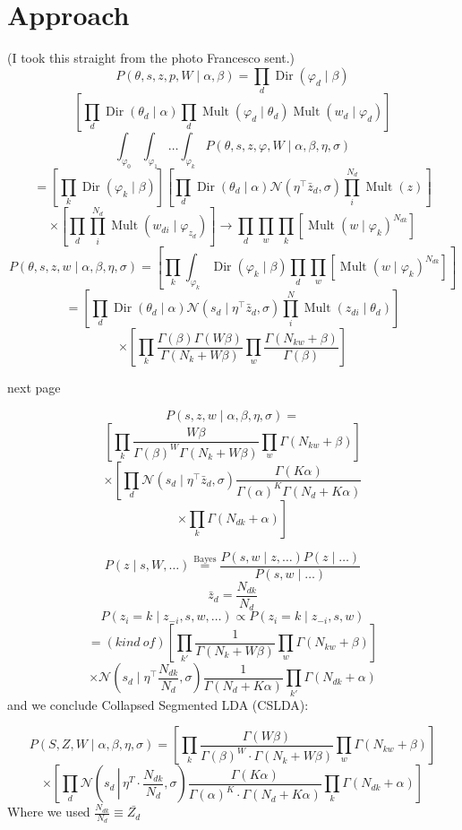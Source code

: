 \documentclass[a4paper,10pt]{article}
\DeclareMathOperator{\Dir}{Dir}
\DeclareMathOperator{\Mult}{Mult}
\renewcommand{\phi}{\varphi}
\begin{document}
\section{Approach}
(I took this straight from the photo Francesco sent.)
\begin{equation}
  P(\theta, s, z, p,  W\mid \alpha, \beta) = \prod_{d} \Dir(\varphi_d \mid \beta)
\end{equation}
\[\left[ \prod_{d} \Dir(\theta_d \mid \alpha) \prod_d \Mult(\phi_d \mid \theta_d )\Mult(w_d \mid \phi_d)\right]\]
\[\int_{\phi_0}\int_{\phi_1}\dots \int_{\phi_k} P(\theta, s, z, \phi, W \mid \alpha, \beta, \eta, \sigma)\]
\[=\left[ \prod_k \Dir(\phi_k \mid \beta) \right] \left[ \prod_d \Dir(\theta_d \mid \alpha) \mathcal{N}(\eta^\top \bar{z}_d, \sigma) \prod_i^{N_d} \Mult(z) \right]\]
\[\times \left[  \prod_d \prod_i^{N_d} \Mult(w_{di} \mid \phi_{z_d})\right] \rightarrow \prod_d \prod_w \prod_k \left[ \Mult(w \mid \phi_k)^{N_{dk}}\right]\]
\[P(\theta, s, z, w \mid \alpha, \beta, \eta, \sigma) = \left[ \prod_k \int_{\phi_k} \Dir(\phi_k \mid \beta) \prod_d \prod_w \left[ \Mult(w \mid \phi_k)^{N_{dk}}\right] \right]\]
\[ = \left[ \prod_d \Dir(\theta_d \mid \alpha) \mathcal{N}(s_d \mid \eta^\top \bar{z}_d, \sigma) \prod_i^N \Mult(z_{di} \mid \theta_d) \right]\]
\[\times \left[ \prod_k \frac{\Gamma(\beta) \Gamma(W\beta)}{\Gamma(N_k + W\beta)} \prod_w \frac{\Gamma(N_{kw}+\beta)}{\Gamma(\beta)}\right]\]

{next page}

\[P(s, z, w \mid\alpha, \beta, \eta, \sigma) = \]
\[\left[ \prod_k \frac{W\beta}{\Gamma(\beta)^W \Gamma(N_k + W\beta)} \prod_w \Gamma(N_{kw} + \beta)\right]\]
\[\times \left[\prod_d \mathcal{N}(s_d \mid \eta^\top \bar{z}_d, \sigma) \frac{\Gamma(K\alpha)}{\Gamma(\alpha)^K\Gamma(N_d + K \alpha)}\right.\]
\[\left.\times \prod_k \Gamma(N_{dk} + \alpha)\right]\]

\[P(z\mid s, W, \dots) \overset{\text{Bayes}}{=} \frac{P(s,w \mid z, \dots) P(z\mid \dots)}{P(s,w \mid \dots)}\]
\[\bar{z}_{d} = \frac{N_{dk}}{N_d}\]
\[P(z_i = k \mid z_{-i}, s, w, \dots) \propto P(z_i =k\mid z_{-i}, s, w)\]
\[=(kind~of) \left[ \prod_{k'} \frac{1}{\Gamma(N_k + W\beta)} \prod_w \Gamma(N_{kw} + \beta)\right]\]
\[\times \mathcal{N}\left(s_d \mid \eta^\top \frac{N_{dk}}{N_d}, \sigma\right)\frac{1}{\Gamma(N_d + K\alpha)} \prod_{k'}\Gamma(N_{dk} + \alpha)\]
and we conclude
Collapsed Segmented LDA (CSLDA):

$$ P(S, Z, W \mid \alpha, \beta, \eta, \sigma) = \left[ \prod_k \frac{\Gamma(W \beta)}{\Gamma(\beta)^W \cdot \Gamma(N_k + W \beta)} \prod_w \Gamma(N_{kw} + \beta) \right] $$
$$ \times \left[ \prod_d \mathcal{N}\left(s_d\, \left|\, \eta^T \cdot \frac{N_{dk}}{N_d}, \sigma\right. \right) \frac{\Gamma(K \alpha)}{\Gamma(\alpha)^K \cdot \Gamma(N_d + K \alpha)} \prod_k \Gamma(N_{dk} + \alpha) \right] $$
Where we used $ \frac{N_{dk}}{N_d} \equiv \bar{Z_d} $
\end{document}
